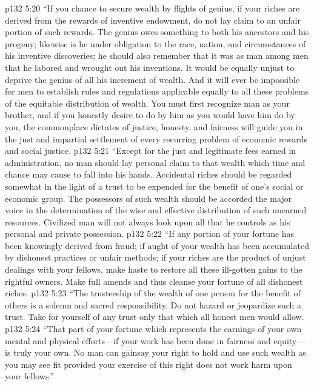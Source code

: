 \pc \vs p132 5:20 \textcolor{ubdarkred}{“\bibnobreakspace If you chance to secure wealth by flights of genius, if your riches are derived from the rewards of inventive endowment, do not lay claim to an unfair portion of such rewards. The genius owes something to both his ancestors and his progeny; likewise is he under obligation to the race, nation, and circumstances of his inventive discoveries; he should also remember that it was as man among men that he labored and wrought out his inventions. It would be equally unjust to deprive the genius of all his increment of wealth. And it will ever be impossible for men to establish rules and regulations applicable equally to all these problems of the equitable distribution of wealth. You must first recognize man as your brother, and if you honestly desire to do by him as you would have him do by you, the commonplace dictates of justice, honesty, and fairness will guide you in the just and impartial settlement of every recurring problem of economic rewards and social justice.}
\pc \vs p132 5:21 \textcolor{ubdarkred}{“\bibnobreakspace Except for the just and legitimate fees earned in administration, no man should lay personal claim to that wealth which time and chance may cause to fall into his hands. Accidental riches should be regarded somewhat in the light of a trust to be expended for the benefit of one’s social or economic group. The possessors of such wealth should be accorded the major voice in the determination of the wise and effective distribution of such unearned resources. Civilized man will not always look upon all that he controls as his personal and private possession.}
\pc \vs p132 5:22 \textcolor{ubdarkred}{“\bibnobreakspace If any portion of your fortune has been knowingly derived from fraud; if aught of your wealth has been accumulated by dishonest practices or unfair methods; if your riches are the product of unjust dealings with your fellows, make haste to restore all these ill\hyp{}gotten gains to the rightful owners. Make full amends and thus cleanse your fortune of all dishonest riches.}
\pc \vs p132 5:23 \textcolor{ubdarkred}{“\bibnobreakspace The trusteeship of the wealth of one person for the benefit of others is a solemn and sacred responsibility. Do not hazard or jeopardize such a trust. Take for yourself of any trust only that which all honest men would allow.}
\pc \vs p132 5:24 \textcolor{ubdarkred}{“\bibnobreakspace That part of your fortune which represents the earnings of your own mental and physical efforts---if your work has been done in fairness and equity---is truly your own. No man can gainsay your right to hold and use such wealth as you may see fit provided your exercise of this right does not work harm upon your fellows.”}
